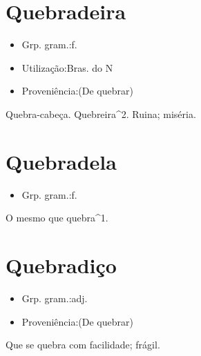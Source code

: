 \section{Quebradeira}
\begin{itemize}
\item {Grp. gram.:f.}
\end{itemize}
\begin{itemize}
\item {Utilização:Bras. do N}
\end{itemize}
\begin{itemize}
\item {Proveniência:(De \textunderscore quebrar\textunderscore )}
\end{itemize}
Quebra-cabeça.
Quebreira^2.
Ruina; miséria.
\section{Quebradela}
\begin{itemize}
\item {Grp. gram.:f.}
\end{itemize}
O mesmo que \textunderscore quebra\textunderscore ^1.
\section{Quebradiço}
\begin{itemize}
\item {Grp. gram.:adj.}
\end{itemize}
\begin{itemize}
\item {Proveniência:(De \textunderscore quebrar\textunderscore )}
\end{itemize}
Que se quebra com facilidade; frágil.
